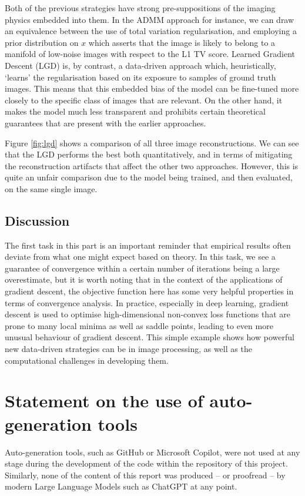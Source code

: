 \documentclass[12pt]{article}
\begin{document}
Both of the previous strategies have strong pre-suppositions of the imaging physics embedded into them.
In the ADMM approach for instance, we can draw an equivalence between the use of total variation regularisation,
and employing a prior distribution on $x$ which asserts that the image is likely to belong to a manifold of low-noise images with respect to the L1 TV score.
Learned Gradient Descent (LGD) is, by contrast, a data-driven approach which, heuristically, `learns' the regularisation based on its exposure to samples of ground truth images.
This means that this embedded bias of the model can be fine-tuned more closely to the specific class of images that are relevant.
On the other hand, it makes the model much less transparent and prohibits certain theoretical guarantees that are present with the earlier approaches.

Figure \ref{fig:lgd} shows a comparison of all three image reconstructions.
We can see that the LGD performs the best both quantitatively,
and in terms of mitigating the reconstruction artifacts that affect the other two approaches.
However, this is quite an unfair comparison due to the model being trained, and then evaluated, on the same single image.

\subsection{Discussion}

The first task in this part is an important reminder that empirical results often deviate from what one might expect based on theory.
In this task, we see a guarantee of convergence within a certain number of iterations being a large overestimate,
but it is worth noting that in the context of the applications of gradient descent,
the objective function here has some very helpful properties in terms of convergence analysis.
In practice, especially in deep learning, gradient descent is used to optimise high-dimensional non-convex loss functions that are prone to many local minima as well as saddle points,
leading to even more unusual behaviour of gradient descent.
This simple example shows how powerful new data-driven strategies can be in image processing,
as well as the computational challenges in developing them.




\appendix

\section{Statement on the use of auto-generation tools}

Auto-generation tools, such as GitHub or Microsoft Copilot, were not used at any stage during the development of the code within the repository of this project.
Similarly, none of the content of this report was produced -- or proofread -- by modern Large Language Models such as ChatGPT at any point.
\end{document}
